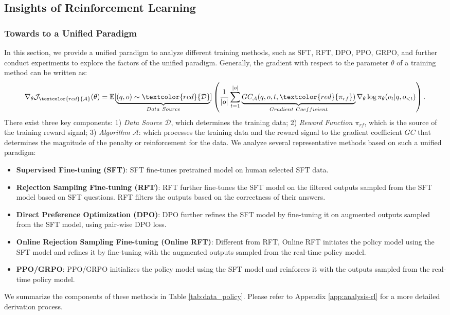 \subsection{Insights of Reinforcement Learning}
\subsubsection{Towards to a Unified Paradigm}
In this section, we provide a unified paradigm to analyze different training methods, such as SFT, RFT, DPO, PPO, GRPO, and further conduct experiments to explore the factors of the unified paradigm. 
Generally, the gradient with respect to the parameter $\theta$ of a training method can be written as:
\begin{equation}
    \nabla_{\theta}\mathcal{J}_{\textcolor{red}{\mathcal{A}}}(\theta) = \mathbb{E}[\underbrace{(q,o) \sim \textcolor{red}{\mathcal{D}}}_{Data \ Source}]\left( \frac{1}{|o|} \sum_{t=1}^{|o|}  \underbrace{GC_{{\mathcal{A}}}(q, o, t, \textcolor{red}{\pi_{{rf}}})}_{Gradient \ Coefficient}  \nabla_{\theta}\log \pi_{\theta}(o_t | q, o_{<t})\right).
\label{eq:objective}
\end{equation}
There exist three key components: 
1) \textit{Data Source $\mathcal{D}$}, which determines the training data;
2) \textit{Reward Function $\pi_{{rf}}$}, which is the source of the training reward signal;
3) \textit{Algorithm $\mathcal{A}$}: which processes the training data and the reward signal to the gradient coefficient $GC$ that determines the magnitude of the penalty or reinforcement for the data. We analyze several representative methods based on such a unified paradigm:




\begin{itemize}
    \item  \textbf{Supervised Fine-tuning (SFT)}: SFT fine-tunes pretrained model on human selected SFT data.
    \item \textbf{Rejection Sampling Fine-tuning (RFT)}: RFT further fine-tunes the SFT model on the filtered outputs sampled from the SFT model based on SFT questions. RFT filters the outputs based on the correctness of their answers.
    \item \textbf{Direct Preference Optimization (DPO)}: DPO further refines the SFT model by fine-tuning it on augmented outputs sampled from the SFT model, using pair-wise DPO loss.
    \item \textbf{Online Rejection Sampling Fine-tuning (Online RFT)}: Different from RFT, Online RFT initiates the policy model using the SFT model and refines it by fine-tuning with the augmented outputs sampled from the real-time policy model.
    \item \textbf{PPO/GRPO}: PPO/GRPO initializes the policy model using the SFT model and reinforces it with the outputs sampled from the real-time policy model.
\end{itemize}
We summarize the components of these methods in Table \ref{tab:data_policy}.
Please refer to Appendix \ref{app:analysis-rl} for a more detailed derivation process.








